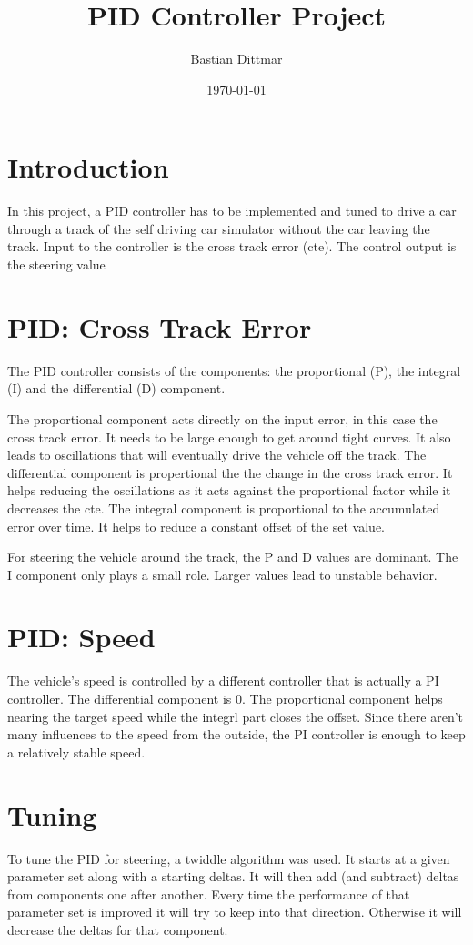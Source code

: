 \documentclass[a4paper, 11pt, DIV=14]{scrartcl}
\author{Bastian Dittmar}
\date{\today}
\title{PID Controller Project}
\begin{document}
\maketitle


\section*{Introduction}
In this project, a PID controller has to be implemented and tuned to drive a car through a track of the self driving car simulator without the car leaving the track. Input to the controller is the cross track error (cte). The control output is the steering value

\section*{PID: Cross Track Error}
The PID controller consists of the components: the proportional (P), the integral (I) and the differential (D) component. 

The proportional component acts directly on the input error, in this case the cross track error. It needs to be large enough to get around tight curves. It also leads to oscillations that will eventually drive the vehicle off the track. 
The differential component is propertional the the change in the cross track error. It helps reducing the oscillations as it acts against the proportional factor while it decreases the cte.
The integral component is proportional to the accumulated error over time. It helps to reduce a constant offset of the set value.

For steering the vehicle around the track, the P and D values are dominant. The I component only plays a small role. Larger values lead to unstable behavior.

\section*{PID: Speed}
The vehicle's speed is controlled by a different controller that is actually a PI controller. The differential component is 0. The proportional component helps nearing the target speed while the integrl part closes the offset. Since there aren't many influences to the speed from the outside, the PI controller is enough to keep a relatively stable speed.

\section*{Tuning}
To tune the PID for steering, a twiddle algorithm was used. It starts at a given parameter set along with a starting deltas. It will then add (and subtract) deltas from components one after another. Every time the performance of that parameter set is improved it will try to keep into that direction. Otherwise it will decrease the deltas for that component.
\end{document}
